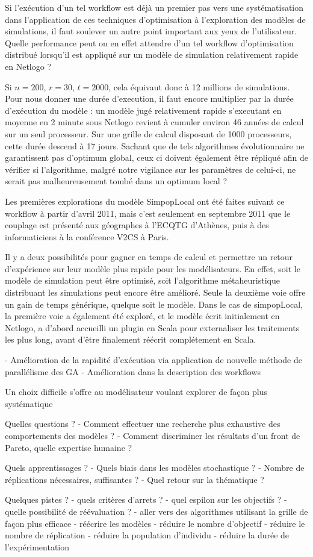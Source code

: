 Si l'exécution d'un tel workflow est déjà un premier pas vers une systématisation dans l'application de ces techniques d'optimisation à l'exploration des modèles de simulations, il faut soulever un autre point important aux yeux de l'utilisateur. Quelle performance peut on en effet attendre d'un tel workflow d'optimisation distribué lorsqu'il est appliqué sur un modèle de simulation relativement rapide en Netlogo ?

Si $n=200$, $r = 30$, $t=2000$, cela équivaut donc à 12 millions de simulations. Pour nous donner une durée d'execution, il faut encore multiplier par la durée d'exécution du modèle : un modèle jugé relativement rapide s'executant en moyenne en 2 minute sous Netlogo revient à cumuler environ 46 années de calcul sur un seul processeur. Sur une grille de calcul disposant de 1000 processeurs, cette durée descend à 17 jours. Sachant que de tels algorithmes évolutionnaire ne garantissent pas d'optimum global, ceux ci doivent également être répliqué afin de vérifier si l'algorithme, malgré notre vigilance sur les paramètres de celui-ci, ne serait pas malheureusement tombé dans un optimum local ?

Les premières explorations du modèle SimpopLocal ont été faites suivant ce workflow à partir d'avril 2011, mais c'est seulement en septembre 2011 que le couplage est présenté aux géographes à l'ECQTG d'Athènes, puis à des informaticiens à la conférence V2CS à Paris.

Il y a deux possibilités pour gagner en temps de calcul et permettre un retour d'expérience sur leur modèle plus rapide pour les modélisateurs. En effet, soit le modèle de simulation peut être optimisé, soit l'algorithme métaheuristique distribuant les simulations peut encore être amélioré. Seule la deuxième voie offre un gain de temps générique, quelque soit le modèle. Dans le cas de simpopLocal, la première voie a également été exploré, et le modèle écrit initialement en Netlogo, a d'abord accueilli un plugin en Scala pour externaliser les traitements les plus long, avant d'être finalement réécrit complétement en Scala.




- Amélioration de la rapidité d'exécution via application de nouvelle méthode de parallélisme des GA
- Amélioration dans la description des workflows


Un choix difficile s'offre au modélisateur voulant explorer de façon plus systématique

Quelles questions ?
- Comment effectuer une recherche plus exhaustive des comportements des modèles ?
- Comment discriminer les résultats d'un front de Pareto, quelle expertise humaine ?

Quels apprentissages ?
- Quels biais dans les modèles stochastique ?
- Nombre de réplications nécessaires, suffisantes ?
- Quel retour sur la thématique ?

Quelques pistes ?
- quels critères d'arrets ?
- quel espilon sur les objectifs ?
- quelle possibilité de réévaluation ?
- aller vers des algorithmes utilisant la grille de façon plus efficace
- réécrire les modèles
- réduire le nombre d'objectif
- réduire le nombre de réplication
- réduire la population d'individu
- réduire la durée de l'expérimentation
